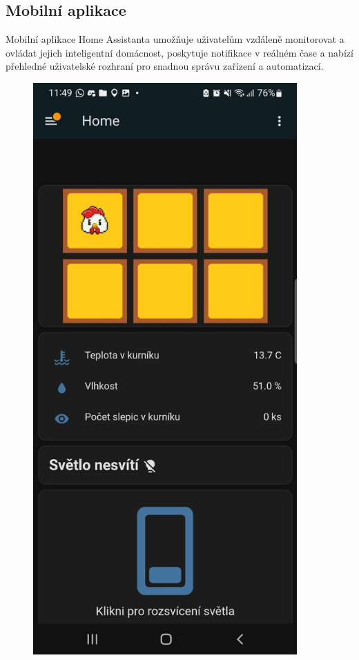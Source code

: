\subsection*{Mobilní aplikace}
Mobilní aplikace Home Assistanta umožňuje uživatelům vzdáleně monitorovat a ovládat jejich inteligentní domácnost, poskytuje notifikace v reálném čase a nabízí přehledné uživatelské rozhraní pro snadnou správu zařízení a automatizací.

\begin{figure}[htbp]
    \centering
    \begin{minipage}[t]{0.5\textwidth}
        \centering
        \includegraphics[width=0.9\textwidth]{img/mobilni_apka1}

\end{minipage}
\end{figure}

